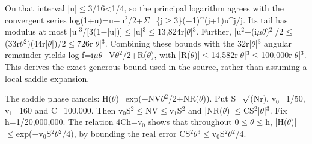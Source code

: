 \documentclass[11pt,a4paper]{article}
\begin{document}
On that interval |u|\ensuremath{\leq}3/16<1/4, so the principal logarithm agrees with the convergent series log(1+u)=u\ensuremath{-}u\ensuremath{^2}/2+\ensuremath{\Sigma}\_\{j\ensuremath{\geq}3\}(\ensuremath{-}1)\textasciicircum{}(j+1)u\textasciicircum{}j/j. Its tail has modulus at most |u|\ensuremath{^3}/[3(1\ensuremath{-}|u|)]\ensuremath{\leq}|u|\ensuremath{^3}\ensuremath{\leq}13,824r|\ensuremath{\theta}|\ensuremath{^3}. Further, |u\ensuremath{^2}\ensuremath{-}(i\ensuremath{\mu}\ensuremath{\theta})\ensuremath{^2}|/2\ensuremath{\leq}(33r\ensuremath{\theta}\ensuremath{^2})(44r|\ensuremath{\theta}|)/2\ensuremath{\leq}726r|\ensuremath{\theta}|\ensuremath{^3}. Combining these bounds with the 32r|\ensuremath{\theta}|\ensuremath{^3} angular remainder yields log f=i\ensuremath{\mu}\ensuremath{\theta}\ensuremath{-}V\ensuremath{\theta}\ensuremath{^2}/2+R(\ensuremath{\theta}), with |R(\ensuremath{\theta})|\ensuremath{\leq}14,582r|\ensuremath{\theta}|\ensuremath{^3}\ensuremath{\leq}100,000r|\ensuremath{\theta}|\ensuremath{^3}. This derives the exact generous bound used in the source, rather than assuming a local saddle expansion.

The saddle phase cancels: H(\ensuremath{\theta})=exp(\ensuremath{-}NV\ensuremath{\theta}\ensuremath{^2}/2+NR(\ensuremath{\theta})). Put S=\ensuremath{\surd}(Nr), v\ensuremath{_0}=1/50, v\ensuremath{_1}=160 and C=100,000. Then v\ensuremath{_0}S\ensuremath{^2}\ensuremath{\leq}NV\ensuremath{\leq}v\ensuremath{_1}S\ensuremath{^2} and |NR(\ensuremath{\theta})|\ensuremath{\leq}CS\ensuremath{^2}|\ensuremath{\theta}|\ensuremath{^3}. Fix h=1/20,000,000. The relation 4Ch=v\ensuremath{_0} shows that throughout 0\ensuremath{\leq}\ensuremath{\theta}\ensuremath{\leq}h, |H(\ensuremath{\theta})|\ensuremath{\leq}exp(\ensuremath{-}v\ensuremath{_0}S\ensuremath{^2}\ensuremath{\theta}\ensuremath{^2}/4), by bounding the real error CS\ensuremath{^2}\ensuremath{\theta}\ensuremath{^3}\ensuremath{\leq}v\ensuremath{_0}S\ensuremath{^2}\ensuremath{\theta}\ensuremath{^2}/4.
\end{document}
